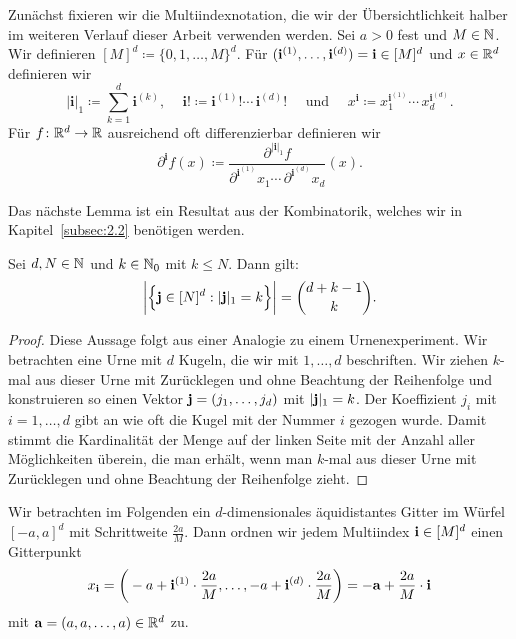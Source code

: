 Zunächst fixieren wir die Multiindexnotation, die wir der Übersichtlichkeit halber im weiteren Verlauf dieser Arbeit verwenden werden. Sei $a > 0$ fest und $M \in \mathbb{N}$. Wir definieren $[M]^d \coloneqq\{0, 1, \dots, M\}^d.$ 
Für $(\mathbf{i}^{(1)},\dots,\mathbf{i}^{(d)}) = \mathbf{i} \in [M]^d$ und $x \in \mathbb{R}^d$ definieren wir
$$|\mathbf{i}|_1 \coloneqq \sum_{k= 1}^d \mathbf{i}^{(k)} \text{, } \quad \mathbf{i}! \coloneqq \mathbf{i}^{(1)}! \cdots \, \mathbf{i}^{(d)}! \quad \text{ und } \quad x^{\mathbf{i}} \coloneqq x_1^{\mathbf{i}^{(1)}} \cdots \,    x_d^{\mathbf{i}^{(d)}}.$$
Für $f\colon \mathbb{R}^d \to \mathbb{R}$ ausreichend oft differenzierbar definieren wir 
$$\partial^{\mathbf{i}}f(x) \coloneqq \frac{\partial^{|\mathbf{i}|_1}f}{\partial^{\mathbf{i}^{(1)}} x_1 \cdots \, \partial^{\mathbf{i}^{(d)}} x_d} (x).$$

Das nächste Lemma ist ein Resultat aus der Kombinatorik, welches wir in Kapitel~\ref{subsec:2.2} benötigen werden.
\begin{lem}
\label{lem:kombi}
Sei $d, N \in \mathbb{N}$ und $k \in \mathbb{N}_0$ mit $k \leq N$. Dann gilt:
$$\bigg|\Bigl\{\mathbf{j} \in [N]^d : |\mathbf{j}|_1 = k \Bigr\}\bigg| = \binom{d + k - 1}{k}.$$
\end{lem}
\begin{proof}
Diese Aussage folgt aus einer Analogie zu einem Urnenexperiment. Wir betrachten eine Urne mit $d$ Kugeln, die wir mit $1,\dots,d$ beschriften. Wir ziehen $k$-mal aus dieser Urne mit Zurücklegen und ohne Beachtung der Reihenfolge und konstruieren so einen Vektor $\mathbf{j} = (j_1,\dots,j_d)$ mit $|\mathbf{j}|_1 = k$. Der Koeffizient $j_i$ mit $i= 1,\dots,d$ gibt an wie oft die Kugel mit der Nummer $i$ gezogen wurde. Damit stimmt die Kardinalität der Menge auf der linken Seite mit der Anzahl aller Möglichkeiten überein, die man erhält, wenn man $k$-mal aus dieser Urne mit Zurücklegen und ohne Beachtung der Reihenfolge zieht.
\end{proof}


Wir betrachten im Folgenden ein $d$-dimensionales äquidistantes Gitter im Würfel $[-a, a]^d$ mit Schrittweite $\frac{2a}{M}.$ 
Dann ordnen wir jedem Multiindex $\mathbf{i} \in [M]^d$ einen Gitterpunkt
\begin{equation}
\label{eq:gitter}
x_{\mathbf{i}} = \bigg( -a + \mathbf{i}^{(1)} \cdot \frac{2a}{M},\dots, -a + \mathbf{i}^{(d)} \cdot \frac{2a}{M}\bigg) = -\mathbf{a} + \frac{2a}{M} \cdot \mathbf{i}
\end{equation}
mit $\mathbf{a} = (a, a, \dots, a) \in \mathbb{R}^d$ zu.

